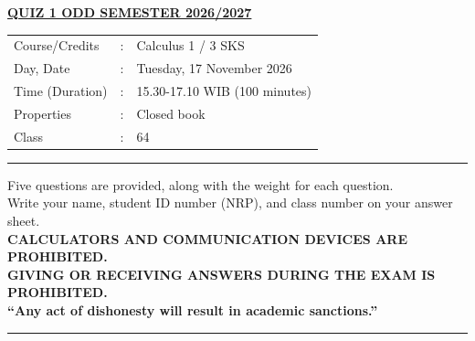 \documentclass[11pt,a4paper]{article}
\begin{document}

\begin{center}
  \underline{\textbf{\MakeUppercase{Quiz 1 Odd Semester 2026/2027}}}
\end{center}

\begin{center}
  \begin{tabular}{lcl}
    Course/Credits  & : & Calculus 1 / 3 SKS            \\
    Day, Date       & : & Tuesday, 17 November 2026     \\
    Time (Duration) & : & 15.30-17.10 WIB (100 minutes) \\
    Properties      & : & Closed book                   \\
    Class           & : & 64
  \end{tabular}
\end{center}

\noindent\rule{\textwidth}{2pt}
\vspace*{-0.9cm}
\begin{center}
  Five questions are provided, along with the weight for each question.\\
  Write your name, student ID number (NRP), and class number on your answer sheet.\\
  {\textbf{\MakeUppercase{Calculators and communication devices are prohibited.}}\\
    \textbf{\MakeUppercase{Giving or receiving answers during the exam is prohibited.}}}\\
  \textbf{``Any act of dishonesty will result in academic sanctions.''}
\end{center}
\vspace*{-0.5cm}
\noindent\rule{\textwidth}{2pt}
\end{document}
